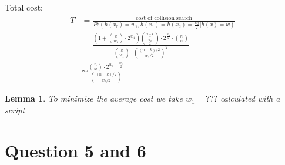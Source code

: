 \documentclass[12pt]{article}
\newtheorem{lemma}{Lemma}
\begin{document}
Total cost:
\[
\begin{split}
  T & = \frac{\text{cost of collision search}}{Pr(h(x_0) = w_1, h(x_1) = h(x_2) = \frac{w_2}{2} | h(x) = w)} \\
  & = \frac{(1+ \binom{k}{w_1}\cdot 2^{w_1})\binom{\frac{n-k}{2}}{\frac{w_2}{2}}\cdot 2^{\frac{w_2}{2}}\cdot \binom{n}{w}}{\binom{k}{w_1} \cdot \binom{(n-k)/2}{w_2/2}^{2}} \\
  & \sim \frac{\binom{n}{w} \cdot 2^{w_1 + \frac{w_2}{2}}}{\binom{(n-k)/2}{w_2/2}}
\end{split}
\]
\begin{lemma}
To minimize the average cost we take $w_1 = ???$ calculated with a script
\end{lemma}
\section{Question 5 and 6}




\end{document}
